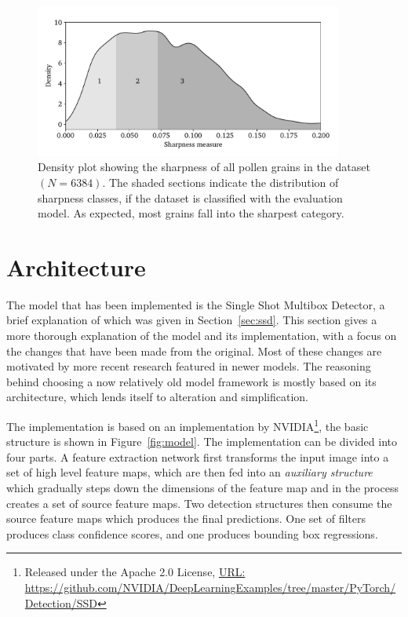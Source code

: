 \begin{figure}[htbp]
  \centering
  \includegraphics[width=0.9\textwidth]{figs/method/sharpness_all.pdf}
  \caption[Distribution of sharpness across entire dataset]{Density plot showing the sharpness of all pollen grains in the dataset \((N=6384)\).
The shaded sections indicate the distribution of sharpness classes, if the dataset is classified with the evaluation model.
As expected, most grains fall into the sharpest category.}\label{fig:sharpness-all}
\end{figure}

\section{Architecture}\label{sec:method-arch}

The model that has been implemented is the Single Shot Multibox Detector, a brief explanation of which was given in Section~\ref{sec:ssd}.
This section gives a more thorough explanation of the model and its implementation, with a focus on the changes that have been made from the original.
Most of these changes are motivated by more recent research featured in newer models.
The reasoning behind choosing a now relatively old model framework is mostly based on its architecture, which lends itself to alteration and simplification.


The implementation is based on an implementation by NVIDIA\footnote{Released under the Apache 2.0 License, \href{https://github.com/NVIDIA/DeepLearningExamples/tree/master/PyTorch/Detection/SSD}{URL:\\ } \url{https://github.com/NVIDIA/DeepLearningExamples/tree/master/PyTorch/Detection/SSD}}, the basic structure is shown in Figure~\ref{fig:model}.
The implementation can be divided into four parts.
A feature extraction network first transforms the input image into a set of high level feature maps, which are then fed into an \textit{auxiliary structure} which gradually steps down the dimensions of the feature map and in the process creates a set of source feature maps.
Two detection structures then consume the source feature maps which produces the final predictions.
One set of filters produces class confidence scores, and one produces bounding box regressions.

